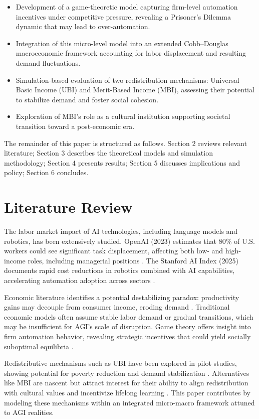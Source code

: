 \documentclass[10pt,a4paper]{article}
\begin{document}
\begin{itemize}
    \item Development of a game-theoretic model capturing firm-level automation incentives under competitive pressure, revealing a Prisoner's Dilemma dynamic that may lead to over-automation.
    \item Integration of this micro-level model into an extended Cobb--Douglas macroeconomic framework accounting for labor displacement and resulting demand fluctuations.
    \item Simulation-based evaluation of two redistribution mechanisms: Universal Basic Income (UBI) and Merit-Based Income (MBI), assessing their potential to stabilize demand and foster social cohesion.
    \item Exploration of MBI’s role as a cultural institution supporting societal transition toward a post-economic era.
\end{itemize}

The remainder of this paper is structured as follows. Section 2 reviews relevant literature; Section 3 describes the theoretical models and simulation methodology; Section 4 presents results; Section 5 discusses implications and policy; Section 6 concludes.

\section{Literature Review}
The labor market impact of AI technologies, including language models and robotics, has been extensively studied. OpenAI (2023) estimates that 80\% of U.S. workers could see significant task displacement, affecting both low- and high-income roles, including managerial positions \cite{OpenAI2023}. The Stanford AI Index (2025) documents rapid cost reductions in robotics combined with AI capabilities, accelerating automation adoption across sectors \cite{StanfordAI2025}.

Economic literature identifies a potential destabilizing paradox: productivity gains may decouple from consumer income, eroding demand \cite{MIT2025}. Traditional economic models often assume stable labor demand or gradual transitions, which may be insufficient for AGI’s scale of disruption. Game theory offers insight into firm automation behavior, revealing strategic incentives that could yield socially suboptimal equilibria \cite{VendingBench2025}.

Redistributive mechanisms such as UBI have been explored in pilot studies, showing potential for poverty reduction and demand stabilization \cite{MIT2025}. Alternatives like MBI are nascent but attract interest for their ability to align redistribution with cultural values and incentivize lifelong learning \cite{CarnegieMellon2025}. This paper contributes by modeling these mechanisms within an integrated micro-macro framework attuned to AGI realities.
\end{document}
